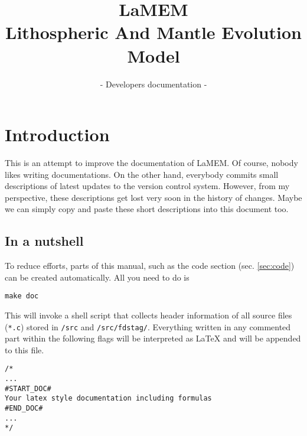 \documentclass{scrartcl}
\title{LaMEM \\ Lithospheric And Mantle Evolution Model}
\subtitle{- Developers documentation -}
\author{\svnfileauthor}
\date{\svntoday}
\begin{document}
\maketitle
\tableofcontents



\section{Introduction}
This is an attempt to improve the documentation of LaMEM. Of course, nobody likes writing documentations. On the other hand, everybody commits small descriptions of latest updates to the version control system. However, from my perspective, these descriptions get lost very soon in the history of changes. Maybe we can simply copy and paste these short descriptions into this document too.

\subsection{In a nutshell}
To reduce efforts, parts of this manual, such as the code section (sec. \ref{sec:code}) can be created automatically. All you need to do is 
\begin{Verbatim}
make doc
\end{Verbatim}

This will invoke a shell script that collects header information of all source files  (\texttt{*.c}) stored in \texttt{/src} and \texttt{/src/fdstag/}.  Everything written in any commented part  within the following flags will be interpreted as LaTeX and will be appended to this file.
\vspace{2mm}
\begin{Verbatim}[frame=single,label=*.c file]
/* 
...
#START_DOC#
Your latex style documentation including formulas
#END_DOC#
...
*/
\end{Verbatim}
\end{document}
